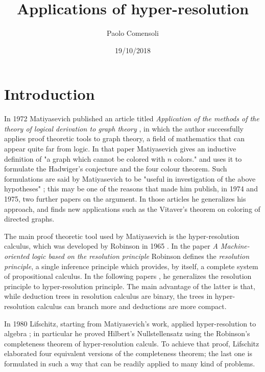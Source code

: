 \documentclass[a4paper,12pt,oneside]{book}
\title{Applications of hyper-resolution}
\author{Paolo Comensoli}
\date{19/10/2018}
\begin{document}
 

%



\setlength{\parskip}{-0.7mm} 
\setcounter{page}{1}
\tableofcontents
\thispagestyle{empty}
\newpage
\setlength{\parskip}{1mm} 



\chapter*{Introduction} %

In 1972 Matiyasevich published an article titled \textit{Application of the methods of the theory of logical derivation to graph theory} \cite{mat-2}, in which the author successfully applies proof theoretic tools to graph theory, a field of mathematics that can appear quite far from logic. 
In that paper Matiyasevich  gives an inductive definition of "a graph which cannot be colored with $n$ colors." and uses it to formulate  the Hadwiger's conjecture and the four colour theorem. 
Such formulations are said by  Matiyasevich to be "useful in investigation of the above hypotheses" \cite{mat-2}; this may be one of the reasons that made him publish, in 1974 and 1975, two further papers \cite{mat-3,mat-1} on the argument.
 In those articles he generalizes his approach, and finds new applications such as the Vitaver's theorem on coloring of directed graphs.

The main proof theoretic tool used by Matiyasevich is the hyper-resolution calculus, which was developed by Robinson in 1965 \cite{robinson,rob,robinson-general}. 
In the paper \textit{A Machine-oriented logic based on the resolution principle} \cite{robinson} Robinson defines the \textit{resolution principle}, a single inference principle which provides, by itself, a complete system of propositional calculus.  
In the following papers  \cite{rob,robinson-general}, he generalizes the resolution principle to hyper-resolution principle. 
The main advantage of the latter  is that, while deduction trees in resolution calculus are binary, the trees in hyper-resolution calculus can branch more  and deductions are more compact.


\newpage\vspace*{1mm}
In 1980 Lifschitz, starting from Matiyasevich's work, applied hyper-resolution to algebra \cite{lifschitz}; in particular he proved Hilbert's Nullstellensatz using the Robinson's completeness theorem of hyper-resolution calculs. 
To achieve that proof, Lifschitz elaborated four equivalent versions of the completeness theorem; the last one is formulated in such a way that can be readily applied to many kind of problems.
\end{document}
